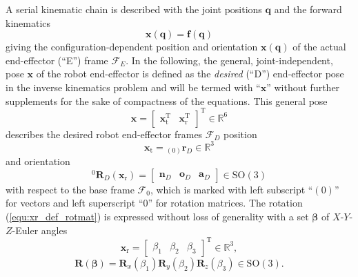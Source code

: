 \documentclass{svproc}
\newcommand{\bm}[1]{\boldsymbol{#1}}
\newcommand{\ortvek}[4]{{ }_{(#1)}{\boldsymbol{#2}}^{#3}_{#4} }
\newcommand{\vek}[3]{\boldsymbol{#1}^{#2}_{#3}}
\newcommand{\rotmat}[2]{{{ }^{#1}\boldsymbol{R}}_{#2}}
\newcommand{\transp}[0]{{\mathrm{T}}}
\newcommand{\ks}[1]{{\mathcal{F}}_{#1}}
\begin{document}
A serial kinematic chain is described with the joint positions $\bm{q}$ and the forward kinematics
\vspace{-0.5em}
%
\begin{equation}
\bm{x} (\bm{q})
=
\bm{f} (\bm{q})
\label{equ:dirkin}
\end{equation}
%
giving the configuration-dependent position and orientation $\bm{x} (\bm{q})$ of the actual end-effector (``E'') frame $\ks{E}$.
In the following, the general, joint-independent, pose $\bm{x}$ of the robot end-effector is defined as the \emph{desired} (``D'') end-effector pose in the inverse kinematics problem and will be termed with ``$\bm{x}$'' without further supplements for the sake of compactness of the equations.
This general pose
%
\begin{equation}
\bm{x}
=
\begin{bmatrix}
\bm{x}_{\mathrm{t}}^\transp & \bm{x}_{\mathrm{r}}^\transp
\end{bmatrix}^\transp
\in {\mathbb{R}}^{6}
\label{equ:x_def}
\end{equation}
%
describes the desired robot end-effector frames $\ks{D}$ position 
%
\begin{equation}
\bm{x}_{\mathrm{t}}
=
\ortvek{0}{r}{}{D}
\in {\mathbb{R}}^{3}
\label{equ:xt_def}
\end{equation}  
%
and orientation 
\vspace{-0.5em}
%
\begin{equation}
\rotmat{0}{D} (\bm{x}_{\mathrm{r}})
=
\begin{bmatrix}\vek{n}{}{D} & \vek{o}{}{D} & \vek{a}{}{D}\end{bmatrix} \in \mathrm{SO(3)}
\label{equ:xr_def_rotmat}
\end{equation}  
% 
with respect to the base frame $\ks{0}$, which is marked with left subscript ``$(0)$'' for vectors and left superscript ``$0$'' for rotation matrices.
The rotation (\ref{equ:xr_def_rotmat}) is expressed without loss of generality with a set $\bm{\beta}$ of $X$-$Y$-$Z$-Euler angles
%
\begin{equation}
\bm{x}_{\mathrm{r}}
=
\begin{bmatrix}
\beta_1  & \beta_2 & \beta_3
\end{bmatrix}^{\mathrm{T}}
\in {\mathbb{R}}^{3},
\label{equ:xr_def}
\end{equation} 
%
\begin{equation}
\bm{R}(\bm{\beta}) = \bm{R}_x(\beta_1) \bm{R}_y(\beta_2) \bm{R}_z(\beta_3) \in \mathrm{SO(3)}.
\label{equ:def_rmat_xyz}
\end{equation}
\end{document}
